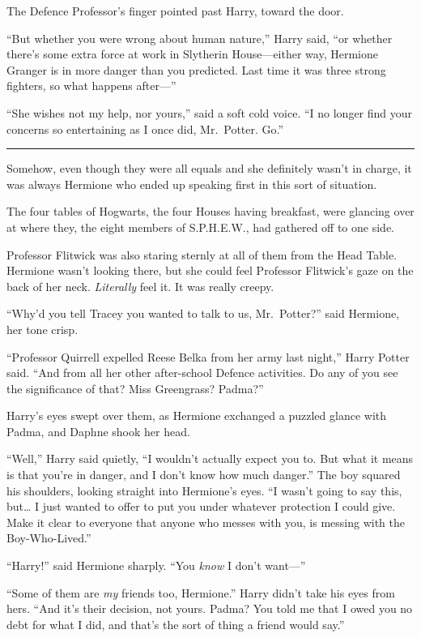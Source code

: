 The Defence Professor's finger pointed past Harry, toward the door.

``But whether you were wrong about human nature,'' Harry said, ``or
whether there's some extra force at work in Slytherin House---either
way, Hermione Granger is in more danger than you predicted. Last time it
was three strong fighters, so what happens after---''

``She wishes not my help, nor yours,'' said a soft cold voice. ``I no
longer find your concerns so entertaining as I once did, Mr.~Potter.
Go.''

\begin{center}\rule{3in}{0.4pt}\end{center}

Somehow, even though they were all equals and she definitely wasn't in
charge, it was always Hermione who ended up speaking first in this sort
of situation.

The four tables of Hogwarts, the four Houses having breakfast, were
glancing over at where they, the eight members of S.P.H.E.W., had
gathered off to one side.

Professor Flitwick was also staring sternly at all of them from the Head
Table. Hermione wasn't looking there, but she could feel Professor
Flitwick's gaze on the back of her neck. \emph{Literally} feel it. It
was really creepy.

``Why'd you tell Tracey you wanted to talk to us, Mr.~Potter?'' said
Hermione, her tone crisp.

``Professor Quirrell expelled Reese Belka from her army last night,''
Harry Potter said. ``And from all her other after-school Defence
activities. Do any of you see the significance of that? Miss Greengrass?
Padma?''

Harry's eyes swept over them, as Hermione exchanged a puzzled glance
with Padma, and Daphne shook her head.

``Well,'' Harry said quietly, ``I wouldn't actually expect you to. But
what it means is that you're in danger, and I don't know how much
danger.'' The boy squared his shoulders, looking straight into
Hermione's eyes. ``I wasn't going to say this, but\ldots{} I just wanted
to offer to put you under whatever protection I could give. Make it
clear to everyone that anyone who messes with you, is messing with the
Boy-Who-Lived.''

``Harry!'' said Hermione sharply. ``You \emph{know} I don't want---''

``Some of them are \emph{my} friends too, Hermione.'' Harry didn't take
his eyes from hers. ``And it's their decision, not yours. Padma? You
told me that I owed you no debt for what I did, and that's the sort of
thing a friend would say.''

